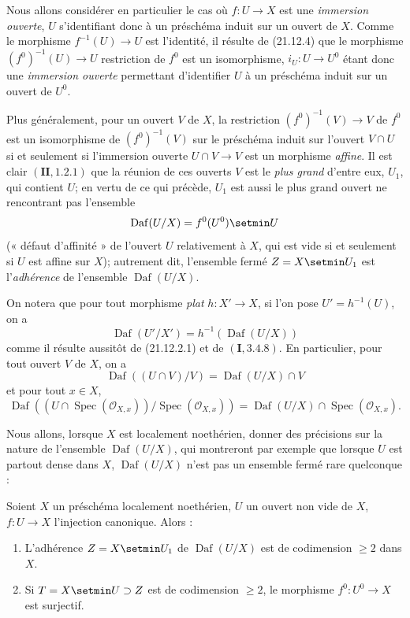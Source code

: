 \begin{env}[21.12.5]
Nous allons considérer en particulier le cas où $f:U\to X$ est une \emph{immersion
ouverte}, $U$ s'identifiant donc à un préschéma induit sur un ouvert de $X$. Comme le
morphisme $f^{-1}(U)\to U$ est l'identité, il résulte de (21.12.4) que le morphisme
$(f^0)^{-1}(U)\to U$ restriction de $f^0$ est un isomorphisme, $i_U:U\to U^0$ étant
donc une \emph{immersion ouverte} permettant d'identifier $U$ à un préschéma induit
sur un ouvert de $U^0$.

Plus généralement, pour un ouvert $V$ de $X$, la restriction $(f^0)^{-1}(V)\to V$ de
$f^0$ est un isomorphisme de $(f^0)^{-1}(V)$ sur le préschéma induit sur l'ouvert
$V\cap U$ si et seulement si l'immersion ouverte $U\cap V\to V$ est un morphisme
\emph{affine}. Il est clair $(\mathbf{II}, 1.2.1)$
que la réunion de ces ouverts $V$ est le \emph{plus grand} d'entre eux, $U_1$, qui
contient $U$; en vertu de ce qui précède, $U_1$ est aussi le plus grand ouvert ne
rencontrant pas l'ensemble
\[
  \operatorname{Daf}(U/X)=f^0(U^0)\setmin U
\]
(« défaut d'affinité » de l'ouvert $U$ relativement à $X$, qui est vide si et seulement
si $U$ est affine sur $X$); autrement dit, l'ensemble fermé $Z=X\setmin U_1$ est
l'\emph{adhérence} de l'ensemble $\operatorname{Daf}(U/X)$.

On notera que pour tout morphisme \emph{plat} $h:X'\to X$, si l'on pose
$U'=h^{-1}(U)$, on a
\[
\label{IV.21.12.5.1}
  \operatorname{Daf}(U'/X')=h^{-1}(\operatorname{Daf}(U/X))
  \tag{21.12.5.1}
\]
comme il résulte aussitôt de (21.12.2.1) et de $(\mathbf I, 3.4.8)$. En particulier,
pour tout ouvert $V$ de $X$, on a
\[
\label{IV.21.12.5.2}
  \operatorname{Daf}((U\cap V)/V)=\operatorname{Daf}(U/X)\cap V
  \tag{21.12.5.2}
\]
et pour tout $x\in X$,
\[
\label{IV.21.12.5.3}
  \operatorname{Daf}((U\cap\operatorname{Spec}(\mathcal O_{X,x}))
  /\operatorname{Spec}(\mathcal O_{X,x}))
  =\operatorname{Daf}(U/X)\cap\operatorname{Spec}(\mathcal O_{X,x}).
  \tag{21.12.5.3}
\]
\end{env}

Nous allons, lorsque $X$ est localement noethérien, donner des précisions sur la nature
de l'ensemble $\operatorname{Daf}(U/X)$, qui montreront par exemple que lorsque $U$ est
partout dense dans $X$, $\operatorname{Daf}(U/X)$ n'est pas un ensemble fermé rare
quelconque :

\begin{theorem}[21.12.6]
\label{IV.21.12.6}
Soient $X$ un préschéma localement noethérien, $U$ un ouvert non vide de $X$,
$f:U\to X$ l'injection canonique. Alors :
\begin{enumerate}[label=\textup{(\roman*)}]
  \item L'adhérence $Z=X\setmin U_1$ de $\operatorname{Daf}(U/X)$ est de codimension
  $\geq2$ dans $X$.
  \item Si $T=X\setmin U\supset Z$ est de codimension $\geq2$, le morphisme
  $f^0:U^0\to X$ est surjectif.
\end{enumerate}
\end{theorem}

